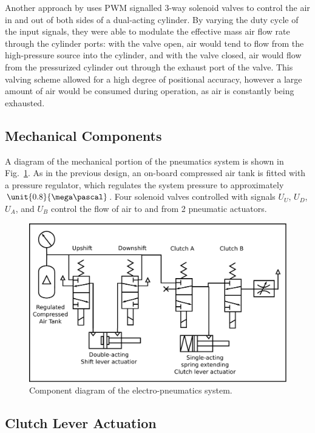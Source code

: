 Another approach by \cite{accurate_position} uses PWM signalled 3-way solenoid valves to control the air in and out of both sides of a dual-acting cylinder. By varying the duty cycle of the input signals, they were able to modulate the effective mass air flow rate through the cylinder ports: with the valve open, air would tend to flow from the high-pressure source into the cylinder, and with the valve closed, air would flow from the pressurized cylinder out through the exhaust port of the valve. This valving scheme allowed for a high degree of positional accuracy, however a large amount of air would be consumed during operation, as air is constantly being exhausted.

\subsection{Mechanical Components}

A diagram of the mechanical portion of the pneumatics system is shown in Fig.\ \ref{fig:pneumatics_design}. As in the previous design, an on-board compressed air tank is fitted with a pressure regulator, which regulates the system pressure to approximately $\unit{0.8}{\mega\pascal}$. Four solenoid valves controlled with signals $U_U$, $U_D$, $U_A$, and $U_B$ control the flow of air to and from 2 pneumatic actuators.

\begin{figure}[H]
	\centering
	\includegraphics[scale=0.5]{design/figures/pneumatics}
	\caption{Component diagram of the electro-pneumatics system.}
	\label{fig:pneumatics_design}
\end{figure}

\subsection{Clutch Lever Actuation}


